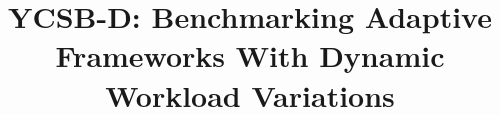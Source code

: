 \documentclass{vldb}
\begin{document}

\title{YCSB-D: Benchmarking Adaptive Frameworks With Dynamic Workload Variations}



%
%
%
%

\end{document}
